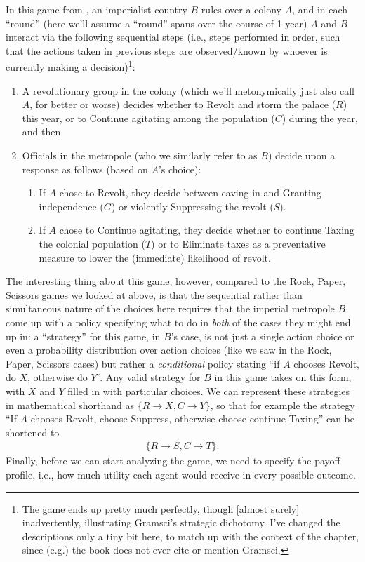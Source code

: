 In this game from \cite{mccarty_political_game_theory}, an imperialist country $B$ rules over a colony $A$, and in each ``round'' (here we'll assume a ``round'' spans over the course of 1 year) $A$ and $B$ interact via the following sequential steps (i.e., steps performed in order, such that the actions taken in previous steps are observed/known by whoever is currently making a decision)\footnote{The game ends up pretty much perfectly, though [almost surely] inadvertently, illustrating Gramsci's strategic dichotomy. I've changed the descriptions only a tiny bit here, to match up with the context of the chapter, since (e.g.) the book does not ever cite or mention Gramsci.}:
\begin{enumerate}
    \item A revolutionary group in the colony (which we'll metonymically just also call $A$, for better or worse) decides whether to Revolt and storm the palace ($R$) this year, or to Continue agitating among the population ($C$) during the year, and then
    \item Officials in the metropole (who we similarly refer to as $B$) decide upon a response as follows (based on $A$'s choice):
    \begin{enumerate}
        \item If $A$ chose to Revolt, they decide between caving in and Granting independence ($G$) or violently Suppressing the revolt ($S$).
        \item If $A$ chose to Continue agitating, they decide whether to continue Taxing the colonial population ($T$) or to Eliminate taxes as a preventative measure to lower the (immediate) likelihood of revolt.
    \end{enumerate}
\end{enumerate}
The interesting thing about this game, however, compared to the Rock, Paper, Scissors games we looked at above, is that the sequential rather than simultaneous nature of the choices here requires that the imperial metropole $B$ come up with a policy specifying what to do in \textit{both} of the cases they might end up in: a ``strategy'' for this game, in $B$'s case, is not just a single action choice or even a probability distribution over action choices (like we saw in the Rock, Paper, Scissors cases) but rather a \textit{conditional} policy stating ``if $A$ chooses Revolt, do $X$, otherwise do $Y$''. Any valid strategy for $B$ in this game takes on this form, with $X$ and $Y$ filled in with particular choices. We can represent these strategies in mathematical shorthand as $\{R \rightarrow X, C \rightarrow Y\}$, so that for example the strategy ``If $A$ chooses Revolt, choose Suppress, otherwise choose continue Taxing'' can be shortened to
\begin{align*}
    \{R \rightarrow S, C \rightarrow T\}.
\end{align*}
Finally, before we can start analyzing the game, we need to specify the payoff profile, i.e., how much utility each agent would receive in every possible outcome.


